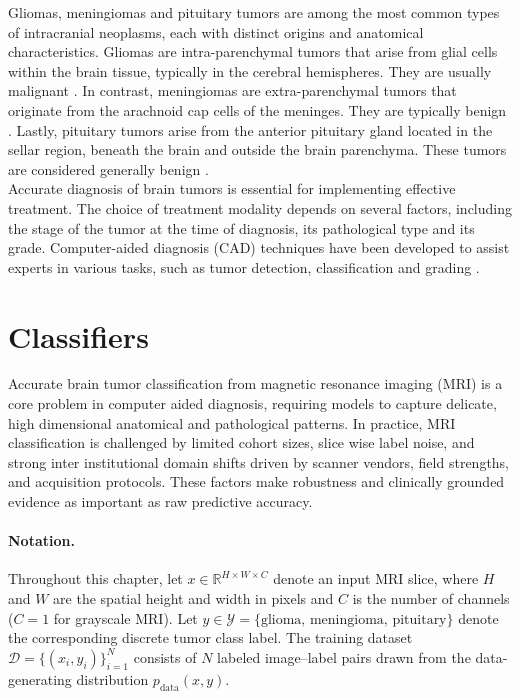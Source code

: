 Gliomas, meningiomas and pituitary tumors are among the most common types of intracranial neoplasms, each with distinct origins and anatomical characteristics. Gliomas are intra-parenchymal tumors that arise from glial cells within the brain tissue, typically in the cerebral hemispheres. They are usually malignant \cite{hernandez2022immunoprofiling}. In contrast, meningiomas are extra-parenchymal tumors that originate from the arachnoid cap cells of the meninges. They are typically benign \cite{cao2023hemorrhagic}. Lastly, pituitary tumors arise from the anterior pituitary gland located in the sellar region, beneath the brain and outside the brain parenchyma. These tumors are considered generally benign \cite{wijethilake2023imaging}.\\

Accurate diagnosis of brain tumors is essential for implementing effective treatment. The choice of treatment modality depends on several factors, including the stage of the tumor at the time of diagnosis, its pathological type and its grade. Computer-aided diagnosis (CAD) techniques have been developed to assist experts in various tasks, such as tumor detection, classification and grading \cite{deepak2019brain}. 

\section{Classifiers}

Accurate brain tumor classification from magnetic resonance imaging (MRI) is a core problem in computer aided diagnosis, requiring models to capture delicate, high dimensional anatomical and pathological patterns. In practice, MRI classification is challenged by limited cohort sizes, slice wise label noise, and strong inter institutional domain shifts driven by scanner vendors, field strengths, and acquisition protocols. These factors make robustness and clinically grounded evidence as important as raw predictive accuracy.\\

\paragraph{Notation.}
Throughout this chapter, let $x \in \mathbb{R}^{H \times W \times C}$ denote an input MRI slice, where $H$ and $W$ are the spatial height and width in pixels and $C$ is the number of channels ($C=1$ for grayscale MRI). Let $y \in \mathcal{Y} = \{\text{glioma},\, \text{meningioma},\, \text{pituitary}\}$ denote the corresponding discrete tumor class label. The training dataset $\mathcal{D} = \{(x_i, y_i)\}_{i=1}^{N}$ consists of $N$ labeled image--label pairs drawn from the data-generating distribution $p_{\text{data}}(x, y)$.

